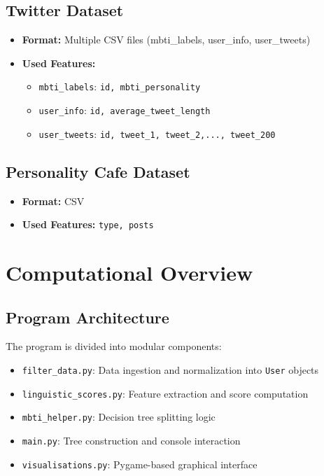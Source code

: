 \documentclass[11pt]{article}
\begin{document}
\subsection{Twitter Dataset}
\begin{itemize}
    \item \textbf{Format:} Multiple CSV files (mbti\_labels, user\_info, user\_tweets)
    \item \textbf{Used Features:} 
    \begin{itemize}
        \item{\texttt{mbti\_labels}}: \texttt{id, mbti\_personality}
        \item{\texttt{user\_info}}: \texttt{id, average\_tweet\_length}
        \item{\texttt{user\_tweets}}: \texttt{id, tweet\_1, tweet\_2,..., tweet\_200}
    \end{itemize}
\end{itemize}

\subsection{Personality Cafe Dataset}
\begin{itemize}
    \item \textbf{Format:} CSV
    \item \textbf{Used Features:} \texttt{type, posts}
\end{itemize}

\section{Computational Overview}

\subsection{Program Architecture}

The program is divided into modular components:
\begin{itemize}
    \item \texttt{filter\_data.py}: Data ingestion and normalization into \texttt{User} objects
    \item \texttt{linguistic\_scores.py}: Feature extraction and score computation
    \item \texttt{mbti\_helper.py}: Decision tree splitting logic
    \item \texttt{main.py}: Tree construction and console interaction
    \item \texttt{visualisations.py}: Pygame-based graphical interface
\end{itemize}
\end{document}
